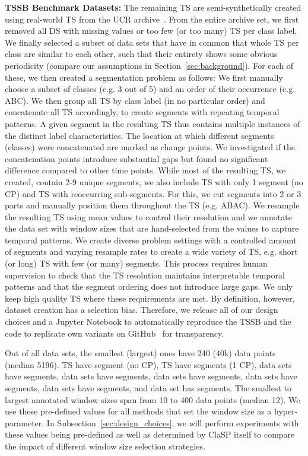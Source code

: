 \documentclass[pdflatex,sn-basic]{sn-jnl}
\begin{document}
\textbf{TSSB Benchmark Datasets:} The remaining  TS are semi-synthetically created using real-world TS from the UCR archive~\citep{UCRClassification}. From the entire archive set, we first removed all DS with missing values or too few (or too many) TS per class label. We finally selected a subset of  data sets that have in common that whole TS per class are similar to each other, such that their entirety shows some obvious periodicity (compare our assumptions in Section~\ref{sec:background}). For each of these, we then created a segmentation problem as follows: We first manually choose a subset of classes (e.g. 3 out of 5) and an order of their occurrence (e.g. ABC). We then group all TS by class label (in no particular order) and concatenate all TS accordingly, to create segments with repeating temporal patterns. A given segment in the resulting TS thus contains multiple instances of the distinct label characteristics. The location at which different segments (classes) were concatenated are marked as change points. We investigated if the concatenation points introduce substantial gaps but found no significant difference compared to other time points. While most of the resulting TS, we created, contain 2-9 unique segments, we also include  TS with only 1 segment (no CP) and  TS with reoccurring sub-segments. For this, we cut segments into 2 or 3 parts and manually position them throughout the TS (e.g. ABAC). We resample the resulting TS using mean values to control their resolution and we annotate the data set with window sizes that are hand-selected from the values  to capture temporal patterns. We create diverse problem settings with a controlled  amount of segments and varying resample rates to create a wide variety of TS, e.g. short (or long) TS with few (or many) segments. This process requires human supervision to check that the TS resolution maintains interpretable temporal patterns and that the segment ordering does not introduce large gaps. We only keep high quality TS where these requirements are met. By definition, however, dataset creation has a selection bias. Therefore, we release all of our design choices and a Jupyter Notebook to automatically reproduce the TSSB and the code to replicate own variants on GitHub~\citep{TSSBWebpage} for transparency.

Out of all  data sets, the smallest (largest) ones have 240 (40k) data points (median 5196).  TS have  segment (no CP),  TS have  segments (1 CP),  data sets have  segments,  data sets have  segments,  data sets have  segments,  data sets have  segments,  data sets have  segments, and  data set has  segments. The smallest to largest annotated window sizes span from 10 to 400 data points (median 12). We use these pre-defined values for all methods that set the window size as a hyper-parameter. In Subsection~\ref{sec:design_choices}, we will perform experiments with these values being pre-defined as well as determined by ClaSP itself to compare the impact of different window size selection strategies.
\end{document}
